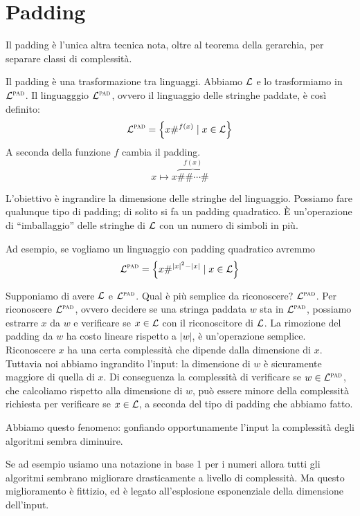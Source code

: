\section{Padding}

Il padding è l'unica altra tecnica nota, oltre al teorema della gerarchia, per separare classi di
complessità.

Il padding è una trasformazione tra linguaggi. Abbiamo $\mathcal{L}$ e lo trasformiamo in $\mathcal{L}^{\textsc{pad}}$.
Il linguagggio $\mathcal{L}^{\textsc{pad}}$, ovvero il linguaggio delle stringhe paddate, è così definito:
\begin{equation*}
    \mathcal{L}^{\textsc{pad}} = \left\{x\#^{f(x)} \mid x \in \mathcal{L}\right\}
\end{equation*}
A seconda della funzione $f$ cambia il padding.
\begin{equation*}
    x \mapsto x\overbrace{\#\#\cdots\#}^{f(x)}
\end{equation*}

L'obiettivo è ingrandire la dimensione delle stringhe del linguaggio. Possiamo fare qualunque tipo
di padding; di solito si fa un padding quadratico. È un'operazione di ``imballaggio'' delle
stringhe di $\mathcal{L}$ con un numero di simboli in più.

Ad esempio, se vogliamo un linguaggio con padding quadratico avremmo
\begin{equation*}
    \mathcal{L}^{\textsc{pad}} = \left\{x\#^{|x|^{2} - |x|} \mid x \in \mathcal{L}\right\}
\end{equation*}

Supponiamo di avere $\mathcal{L}$ e $\mathcal{L}^{\textsc{pad}}$. Qual è più semplice da riconoscere? $\mathcal{L}^{\textsc{pad}}$. Per
riconoscere $\mathcal{L}^{\textsc{pad}}$, ovvero decidere se una stringa paddata $w$ sta in $\mathcal{L}^{\textsc{pad}}$, possiamo estrarre
$x$ da $w$ e verificare se $x \in \mathcal{L}$ con il riconoscitore di $\mathcal{L}$. La rimozione del padding
da $w$ ha costo lineare rispetto a $|w|$, è un'operazione semplice. Riconoscere $x$ ha una certa
complessità che dipende dalla dimensione di $x$. Tuttavia noi abbiamo ingrandito l'input: la
dimensione di $w$ è sicuramente maggiore di quella di $x$. Di conseguenza la complessità di
verificare se $w \in \mathcal{L}^{\textsc{pad}}$, che calcoliamo rispetto alla dimensione di $w$, può essere minore
della complessità richiesta per verificare se $x \in \mathcal{L}$, a seconda del tipo di padding che
abbiamo fatto. 

Abbiamo questo fenomeno: gonfiando opportunamente l'input la complessità degli algoritmi sembra
diminuire.

Se ad esempio usiamo una notazione in base 1 per i numeri allora tutti gli algoritmi sembrano
migliorare drasticamente a livello di complessità. Ma questo miglioramento è fittizio, ed è
legato all'esplosione esponenziale della dimensione dell'input.

